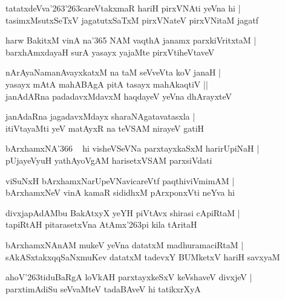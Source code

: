 \documentclass[twoside,12pt,openright]{book}
\def\S{\char'263}
\newcounter{shloka}[chapter]
\begin{document}
\begin{shloka}
tatatxdeVva\S\S careVtakxmaR hariH pirxVNAti yeVna hi |\\
tasimxMsutxSeTxV jagatutxSaTxM pirxVNateV pirxVNitaM jagatf 
\end{shloka}

\begin{shloka}
harw BakitxM vinA na\char'365 NAM vaqthA janamx parxkiVritxtaM |\\
barxhAmxdayaH surA yasayx yajaMte pirxVtiheVtaveV 
\end{shloka}

\begin{shloka}
nArAyaNamanAvayxkatxM na taM seVveVta koV janaH |\\
yasayx mAtA mahABAgA pitA tasayx mahAkaqtiV ||\\
janAdARna padadavxMdavxM haqdayeV yeVna dhArayxteV 
\end{shloka}

\begin{shloka}
janAdaRna jagadavxMdayx sharaNAgatavatasxla |\\
itiVtayaMti yeV matAyxR na teVSAM nirayeV gatiH 
\end{shloka}

\begin{shloka}
bArxhamxNA\char'366 ~ hi visheVSeVNa parxtayxkaSxM harirUpiNaH |\\
pUjayeVyuH yathAyoVgAM harisetxVSAM parxsiVdati 
\end{shloka}

\begin{shloka}
viSuNxH bArxhamxNarUpeVNavicareVtf paqthiviVmimAM |\\
bArxhamxNeV vinA kamaR sididhxM pArxponxVti neYva hi 
\end{shloka}

\begin{shloka}
divxjapAdAMbu BakAtxyX yeYH piVtAvx shirasi cApiRtaM |\\
tapiRtAH pitarasetxVna AtAmx\S pi kila tAritaH 
\end{shloka}

\begin{shloka}
bArxhamxNAnAM mukeV yeVna datatxM madhuramaciRtaM |\\
sAkASxtakxqqSaNxmuKev datatxM tadevxY BUMketxV hariH savxyaM 
\end{shloka}

\begin{shloka}
ahoV\S tiduBaRgA loVkAH parxtayxkeSxV keVshaveV divxjeV |\\
parxtimAdiSu seVvaMteV tadaBAveV hi tatikxrXyA 
\end{shloka}
\end{document}
